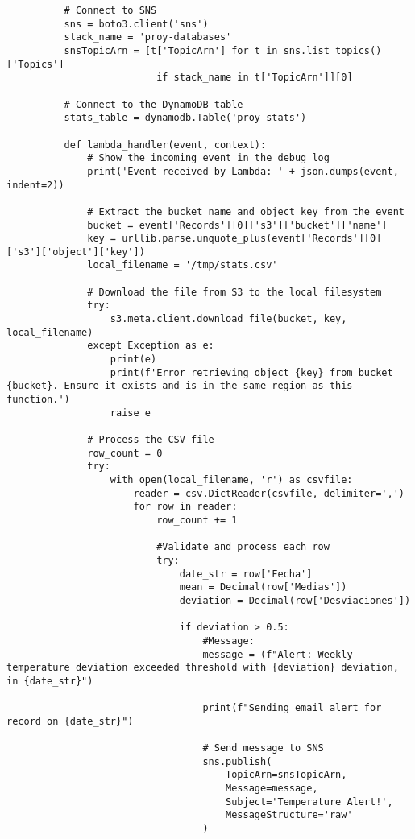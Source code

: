 \begin{verbatim}
          # Connect to SNS 
          sns = boto3.client('sns') 
          stack_name = 'proy-databases' 
          snsTopicArn = [t['TopicArn'] for t in sns.list_topics()['Topics'] 
                          if stack_name in t['TopicArn']][0] 

          # Connect to the DynamoDB table
          stats_table = dynamodb.Table('proy-stats')

          def lambda_handler(event, context):
              # Show the incoming event in the debug log 
              print('Event received by Lambda: ' + json.dumps(event, indent=2))

              # Extract the bucket name and object key from the event
              bucket = event['Records'][0]['s3']['bucket']['name']
              key = urllib.parse.unquote_plus(event['Records'][0]['s3']['object']['key'])
              local_filename = '/tmp/stats.csv'

              # Download the file from S3 to the local filesystem
              try:
                  s3.meta.client.download_file(bucket, key, local_filename)
              except Exception as e:
                  print(e)
                  print(f'Error retrieving object {key} from bucket {bucket}. Ensure it exists and is in the same region as this function.')
                  raise e

              # Process the CSV file
              row_count = 0
              try:
                  with open(local_filename, 'r') as csvfile:
                      reader = csv.DictReader(csvfile, delimiter=',')
                      for row in reader:
                          row_count += 1

                          #Validate and process each row
                          try:
                              date_str = row['Fecha']
                              mean = Decimal(row['Medias'])
                              deviation = Decimal(row['Desviaciones'])

                              if deviation > 0.5:
                                  #Message:
                                  message = (f"Alert: Weekly temperature deviation exceeded threshold with {deviation} deviation, in {date_str}")
                                  
                                  print(f"Sending email alert for record on {date_str}")

                                  # Send message to SNS 
                                  sns.publish( 
                                      TopicArn=snsTopicArn, 
                                      Message=message, 
                                      Subject='Temperature Alert!', 
                                      MessageStructure='raw' 
                                  )


\end{verbatim}
